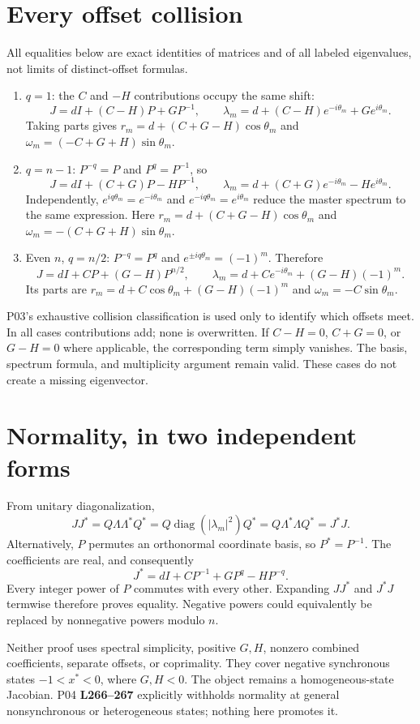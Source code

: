 \documentclass[11pt]{article}
\newcommand{\diag}{\operatorname{diag}}
\newcommand{\lin}[1]{\textbf{L#1}}
\begin{document}
\section{Every offset collision}
All equalities below are exact identities of matrices and of all labeled
eigenvalues, not limits of distinct-offset formulas.
\begin{enumerate}[label=(\roman*)]
\item $q=1$: the $C$ and $-H$ contributions occupy the same shift:
\[
 J=dI+(C-H)P+GP^{-1},\qquad
 \lambda_m=d+(C-H)e^{-i\theta_m}+Ge^{i\theta_m}.
\]
Taking parts gives $r_m=d+(C+G-H)\cos\theta_m$ and
$\omega_m=(-C+G+H)\sin\theta_m$.
\item $q=n-1$: $P^{-q}=P$ and $P^q=P^{-1}$, so
\[
 J=dI+(C+G)P-HP^{-1},\qquad
 \lambda_m=d+(C+G)e^{-i\theta_m}-He^{i\theta_m}.
\]
Independently, $e^{iq\theta_m}=e^{-i\theta_m}$ and
$e^{-iq\theta_m}=e^{i\theta_m}$ reduce the master spectrum to the same
expression. Here $r_m=d+(C+G-H)\cos\theta_m$ and
$\omega_m=-(C+G+H)\sin\theta_m$.
\item Even $n$, $q=n/2$: $P^{-q}=P^q$ and
$e^{\pm iq\theta_m}=(-1)^m$. Therefore
\[
 J=dI+CP+(G-H)P^{n/2},\qquad
 \lambda_m=d+Ce^{-i\theta_m}+(G-H)(-1)^m.
\]
Its parts are $r_m=d+C\cos\theta_m+(G-H)(-1)^m$ and
$\omega_m=-C\sin\theta_m$.
\end{enumerate}
P03's exhaustive collision classification is used only to identify which
offsets meet. In all cases contributions add; none is overwritten.
If $C-H=0$, $C+G=0$, or $G-H=0$ where applicable, the corresponding
term simply vanishes. The basis, spectrum formula, and multiplicity
argument remain valid. These cases do not create a missing eigenvector.

\section{Normality, in two independent forms}
From unitary diagonalization,
\[
 JJ^*=Q\Lambda\Lambda^*Q^*
 =Q\diag(|\lambda_m|^2)Q^*
 =Q\Lambda^*\Lambda Q^*=J^*J.
\]
Alternatively, $P$ permutes an orthonormal coordinate basis, so
$P^*=P^{-1}$. The coefficients are real, and consequently
\[
 J^*=dI+CP^{-1}+GP^q-HP^{-q}.
\]
Every integer power of $P$ commutes with every other. Expanding $JJ^*$
and $J^*J$ termwise therefore proves equality. Negative powers could
equivalently be replaced by nonnegative powers modulo $n$.

Neither proof uses spectral simplicity, positive $G,H$, nonzero combined
coefficients, separate offsets, or coprimality. They cover negative
synchronous states $-1<x^*<0$, where $G,H<0$. The object remains a
homogeneous-state Jacobian. P04 \lin{266--267} explicitly withholds normality
at general nonsynchronous or heterogeneous states; nothing here promotes it.
\end{document}
